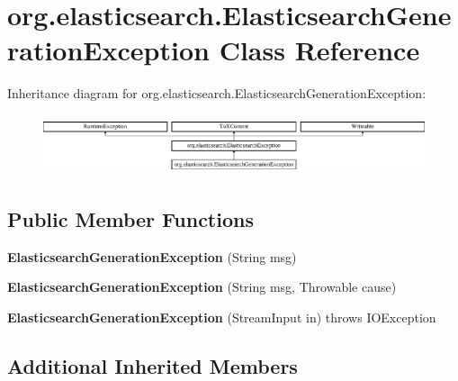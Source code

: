 \hypertarget{classorg_1_1elasticsearch_1_1_elasticsearch_generation_exception}{}\section{org.\+elasticsearch.\+Elasticsearch\+Generation\+Exception Class Reference}
\label{classorg_1_1elasticsearch_1_1_elasticsearch_generation_exception}
Inheritance diagram for org.\+elasticsearch.\+Elasticsearch\+Generation\+Exception\+:\begin{figure}[H]
\begin{center}
\leavevmode
\includegraphics[height=1.777778cm]{classorg_1_1elasticsearch_1_1_elasticsearch_generation_exception}
\end{center}
\end{figure}
\subsection*{Public Member Functions}
\begin{DoxyCompactItemize}
\item 
\hypertarget{classorg_1_1elasticsearch_1_1_elasticsearch_generation_exception_a198115b04b0914bbabec38a9500ccc68}{}\label{classorg_1_1elasticsearch_1_1_elasticsearch_generation_exception_a198115b04b0914bbabec38a9500ccc68} 
{\bfseries Elasticsearch\+Generation\+Exception} (String msg)
\item 
\hypertarget{classorg_1_1elasticsearch_1_1_elasticsearch_generation_exception_a9caf798644d9ce43df2238af7a5b6bcb}{}\label{classorg_1_1elasticsearch_1_1_elasticsearch_generation_exception_a9caf798644d9ce43df2238af7a5b6bcb} 
{\bfseries Elasticsearch\+Generation\+Exception} (String msg, Throwable cause)
\item 
\hypertarget{classorg_1_1elasticsearch_1_1_elasticsearch_generation_exception_aeb911906c82f9f5f96348b7c747e6310}{}\label{classorg_1_1elasticsearch_1_1_elasticsearch_generation_exception_aeb911906c82f9f5f96348b7c747e6310} 
{\bfseries Elasticsearch\+Generation\+Exception} (Stream\+Input in)  throws I\+O\+Exception
\end{DoxyCompactItemize}
\subsection*{Additional Inherited Members}


